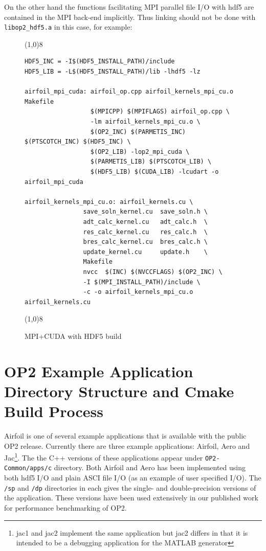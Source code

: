 \documentclass[11pt]{article}
\begin{document}
\newpage
\noindent On the other hand the functions facilitating MPI parallel file I/O with hdf5 are contained in the MPI back-end
implicitly. Thus linking should not be done with \texttt{libop2\_hdf5.a} in this case, for example:

\begin{figure}\small
\vspace{-0pt}\noindent\line(1,0){8}\vspace{-10pt}
\begin{lstlisting}
HDF5_INC = -I$(HDF5_INSTALL_PATH)/include
HDF5_LIB = -L$(HDF5_INSTALL_PATH)/lib -lhdf5 -lz

airfoil_mpi_cuda: airfoil_op.cpp airfoil_kernels_mpi_cu.o Makefile
                  $(MPICPP) $(MPIFLAGS) airfoil_op.cpp \
                  -lm airfoil_kernels_mpi_cu.o \
                  $(OP2_INC) $(PARMETIS_INC) $(PTSCOTCH_INC) $(HDF5_INC) \
                  $(OP2_LIB) -lop2_mpi_cuda \
                  $(PARMETIS_LIB) $(PTSCOTCH_LIB) \
                  $(HDF5_LIB) $(CUDA_LIB) -lcudart -o airfoil_mpi_cuda
                  
airfoil_kernels_mpi_cu.o: airfoil_kernels.cu \
                save_soln_kernel.cu  save_soln.h \
                adt_calc_kernel.cu   adt_calc.h  \
                res_calc_kernel.cu   res_calc.h  \
                bres_calc_kernel.cu  bres_calc.h \
                update_kernel.cu     update.h    \
                Makefile
                nvcc  $(INC) $(NVCCFLAGS) $(OP2_INC) \
                -I $(MPI_INSTALL_PATH)/include \
                -c -o airfoil_kernels_mpi_cu.o airfoil_kernels.cu
\end{lstlisting}\vspace{-10pt}
\vspace{-0pt}\noindent\line(1,0){8}\vspace{-10pt}
\caption{\small MPI+CUDA with HDF5 build }
\normalsize\vspace{-0pt}\label{fig:mpicudahdf5build}
\end{figure}

\newpage\newpage
\section{OP2 Example Application Directory Structure and Cmake Build Process}\label{structure}

Airfoil is one of several example applications that is available with the public OP2 release. Currently there are
three example applications: Airfoil, Aero and Jac\footnote{jac1 and jac2 implement the same application but jac2
differs in that it is intended to be a debugging application for the MATLAB generator}. The the C++ versions of these
applications appear under \texttt{OP2-Common/apps/c} directory. Both Airfoil and Aero has been implemented using both
hdf5 I/O and plain ASCI file I/O (as an example of user specified I/O). The \texttt{/sp} and \texttt{/dp} directories in
each gives the single- and double-precision versions of the application. These versions have been used extensively in
our published work for performance benchmarking of OP2. 
\end{document}

